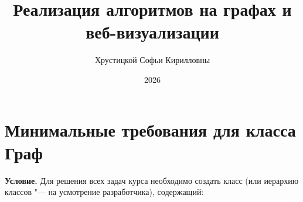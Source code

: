 \documentclass[pract]{SCWorks}
\begin{document}
    \studentfemale


    \title{Реализация алгоритмов на графах и веб-визуализации}





    \author{Хрустицкой Софьи Кирилловны}






    \date{2026}

    \maketitle
    \tableofcontents

    \section{Минимальные требования для класса Граф}

    \textbf{Условие.}
    Для решения всех задач курса необходимо создать класс (или иерархию классов "--- на усмотрение разработчика), содержащий:
\end{document}
